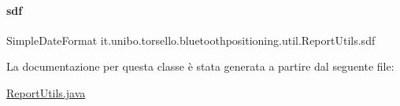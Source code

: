 \paragraph{\texorpdfstring{sdf}{sdf}}
{\footnotesize\ttfamily Simple\+Date\+Format it.\+unibo.\+torsello.\+bluetoothpositioning.\+util.\+Report\+Utils.\+sdf\hspace{0.3cm}{\ttfamily [private]}}



La documentazione per questa classe è stata generata a partire dal seguente file\+:\begin{DoxyCompactItemize}
\item 
\hyperlink{ReportUtils_8java}{Report\+Utils.\+java}\end{DoxyCompactItemize}

